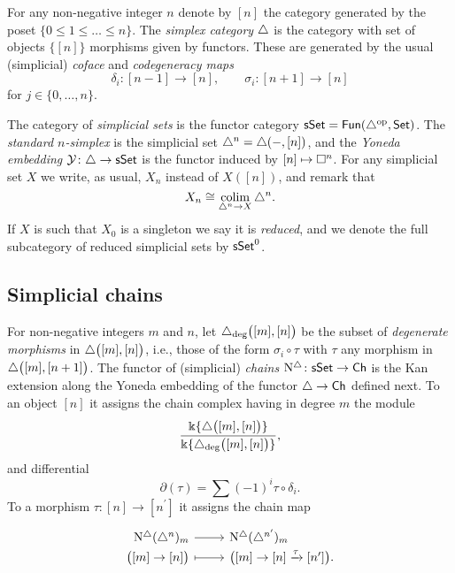 For any non-negative integer $n$ denote by $[n]$ the category generated by the poset $\{0 \leq 1 \leq \dots \leq n\}$.
The \textit{simplex category} $\triangle$ is the category with set of objects $\big\{ [n] \big\}$ morphisms given by functors.
These are generated by the usual (simplicial) \textit{coface} and \textit{codegeneracy maps}
\begin{equation*}
\delta_i \colon [n-1] \to [n], \qquad \sigma_i \colon [n+1] \to [n]
\end{equation*}
for $j \in \{0, \dots, n\}$.

The category of \textit{simplicial sets} is the functor category $\mathsf{sSet} = \mathsf{Fun}(\triangle^{\mathrm{op}}, \mathsf{Set})$.
The \textit{standard $n$-simplex} is the simplicial set $\triangle^n = \triangle(-, [n])$, and the \textit{Yoneda embedding} $\operatorname{\mathcal{Y}} \colon \triangle \to \mathsf{sSet}$ is the functor induced by $[n] \mapsto \square^n$.
For any simplicial set $X$ we write, as usual, $X_n$ instead of $X([n])$, and remark that
\begin{equation*}
X_n \cong \operatorname*{colim}_{\triangle^n \to X} \triangle^n.
\end{equation*}
If $X$ is such that $X_0$ is a singleton we say it is \textit{reduced}, and we denote the full subcategory of reduced simplicial sets by $\mathsf{sSet}^0$.

\subsection{Simplicial chains} \label{ss:simplicial sets}

For non-negative integers $m$ and $n$, let $\triangle_{\deg} \big( [m], [n] \big)$ be the subset of \textit{degenerate morphisms} in $\triangle \big( [m], [n] \big)$, i.e., those of the form $\sigma_i \circ \tau$ with $\tau$ any morphism in $\triangle \big( [m], [n+1] \big)$.
The functor of (simplicial) \textit{chains} $\operatorname{N^{\triangle}} \colon \mathsf{sSet} \to \mathsf{Ch}$ is the Kan extension along the Yoneda embedding of the functor $\triangle \to \mathsf{Ch}$ defined next.
To an object $[n]$ it assigns the chain complex having in degree $m$ the module
\begin{equation*}
\frac{\Bbbk\{\triangle \big( [m], [n] \big) \}}{\Bbbk\{\triangle_{\deg} \big( [m], [n] \big) \}},
\end{equation*}
and differential
\begin{equation*}
\partial(\tau) = \sum (-1)^i \tau \circ \delta_i.
\end{equation*}
To a morphism $\tau \colon [n] \to [n^\prime]$ it assigns the chain map
\begin{equation*}
\begin{tikzcd}[row sep=-3pt, column sep=normal,
/tikz/column 1/.append style={anchor=base east},
/tikz/column 2/.append style={anchor=base west}]
\schains(\simplex^n)_m \arrow[r] &  \schains(\simplex^{n^\prime})_m \\
\big( [m] \to [n] \big) \arrow[r, mapsto] & \big( [m] \to [n] \xra{\tau} [n^\prime] \big).
\end{tikzcd}
\end{equation*}

